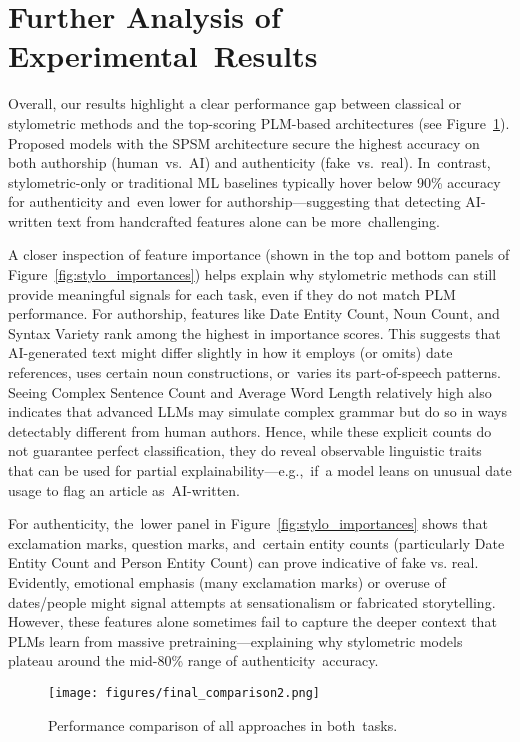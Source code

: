 \documentclass[electronics,article,accept,pdftex,moreauthors,electronics]{Definitions/mdpi}
\begin{document}
\section{Further Analysis of Experimental~Results}\label{S7}

Overall, our results highlight a clear performance gap between classical or stylometric methods and the top-scoring PLM-based architectures (see Figure~\ref{fig:all_approaches_accuracy}). Proposed models with the SPSM architecture secure the highest accuracy on both authorship (human~vs.~AI) and authenticity (fake~vs.~real). In~contrast, stylometric-only or traditional ML baselines typically hover below 90\% accuracy for authenticity and~even lower for authorship---suggesting that detecting AI-written text from handcrafted features alone can be more~challenging.


A closer inspection of feature importance (shown in the top and bottom panels of Figure~\ref{fig:stylo_importances}) helps explain why stylometric methods can still provide meaningful signals for each task, even if they do not match PLM performance. For authorship, features like Date Entity Count, Noun Count, and Syntax Variety rank among the highest in importance scores. This suggests that AI-generated text might differ slightly in how it employs (or omits) date references, uses certain noun constructions, or~varies its part-of-speech patterns. Seeing Complex Sentence Count and Average Word Length relatively high also indicates that advanced LLMs may simulate complex grammar but do so in ways detectably different from human authors. Hence, while these explicit counts do not guarantee perfect classification, they do reveal observable linguistic traits that can be used for partial explainability---e.g.,~if~a model leans on unusual date usage to flag an article as~AI-written.

For authenticity, the~lower panel in Figure~\ref{fig:stylo_importances} shows that exclamation marks, question marks, and~certain entity counts (particularly Date Entity Count and Person Entity Count) can prove indicative of fake vs. real. Evidently, emotional emphasis (many exclamation marks) or overuse of dates/people might signal attempts at sensationalism or fabricated storytelling. However, these features alone sometimes fail to capture the deeper context that PLMs learn from massive pretraining---explaining why stylometric models plateau around the mid-80\% range of authenticity~accuracy.

\begin{figure}[H] %
    \texttt{[image: figures/final\_comparison2.png]}\vspace{-4pt}
    \caption{Performance comparison of all approaches in both~tasks.}
    \label{fig:all_approaches_accuracy}
\end{figure}
\vspace{-6pt}
\end{document}
